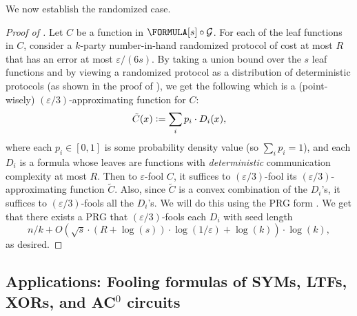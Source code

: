 	We now establish the randomized case.
    
    \begin{proof}[Proof of ]
    	Let $C$ be a function in $\FORMULA[s]\circ \mathcal{G}$. For each of the leaf functions in $C$, consider a $k$-party number-in-hand randomized protocol of cost at most $R$ that has an error at most $\varepsilon/(6s)$. By taking a union bound over the $s$ leaf functions and by viewing a randomized protocol as a distribution of deterministic protocols (as shown in the proof of ), we get the following which is a (point-wisely) $(\varepsilon/3)$-approximating function for $C$:
        \[
            \tilde{C}(x) \vcentcolon=\sum_{i} p_i \cdot D_i(x),
        \]
        where each $p_i\in[0,1]$ is some probability density value (so $\sum_i p_i =1$), and each $D_i$ is a formula whose leaves are functions with \emph{deterministic} communication complexity at most $R$. Then to $\varepsilon$-fool $C$, it suffices to $(\varepsilon/3)$-fool its $(\varepsilon/3)$-approximating function $\tilde{C}$. Also, since $\tilde{C}$ is a convex combination of the $D_i$'s, it suffices to $(\varepsilon/3)$-fools all the $D_i$'s. We will do this using the PRG form . We get that there exists a PRG that $(\varepsilon/3)$-fools each $D_i$ with seed length
        \[
            n/k+O\left(\sqrt{s}\cdot(R+\log(s))\cdot\log(1/\varepsilon)+\log(k)\right)\cdot\log(k),
        \]
        as desired.
    \end{proof}

%
   
%
   
%
%
%
%
%
%
	
%
	
%
	
%
%
%
%
%
%
	
%
	
%
%
%

%
%
%
%
%
%
%
%
%
%
%
%
%
%
%
%
%
%
%
%
%
%
%
%
%
%
%
%
%
%
%
%
%
%
%
%
%
%
%
%
%
%
%
%
%
%
%
%
%
%
%
%
%
    
%
	
%
    
%
%
%
%
%
%
	
%
%
%
	
%
    
%
%
%
%
%
%
%
%
%
%
%

    \subsection{Applications: Fooling formulas of SYMs, LTFs, XORs, and AC\texorpdfstring{$^0$ circuits}{AC0}}

